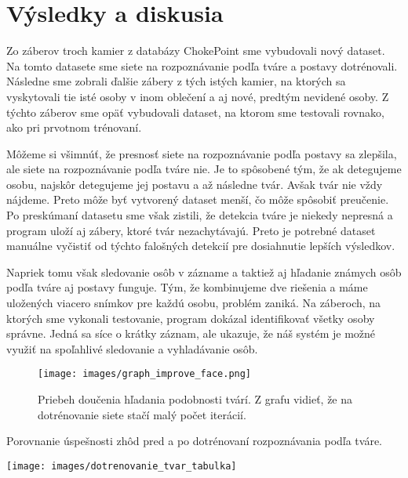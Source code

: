 \section{Výsledky a diskusia}
Zo záberov troch kamier z databázy ChokePoint sme vybudovali nový dataset. 
Na tomto datasete sme siete na rozpoznávanie podľa tváre a postavy dotrénovali.
Následne sme zobrali ďalšie zábery z tých istých kamier, na ktorých sa vyskytovali tie isté osoby v inom oblečení a aj nové, predtým nevidené osoby.
Z týchto záberov sme opäť vybudovali dataset, na ktorom sme testovali rovnako, ako pri prvotnom trénovaní.

Môžeme si všimnúť, že presnosť siete na rozpoznávanie podľa postavy sa zlepšila, ale siete na rozpoznávanie podľa tváre nie.
Je to spôsobené tým, že ak detegujeme osobu, najskôr detegujeme jej postavu a až následne tvár. 
Avšak tvár nie vždy nájdeme. Preto môže byť vytvorený dataset menší, čo môže spôsobiť preučenie.
Po preskúmaní datasetu sme však zistili, že detekcia tváre je niekedy nepresná a program uloží aj zábery, ktoré tvár nezachytávajú.
Preto je potrebné dataset manuálne vyčistiť od týchto falošných detekcií pre dosiahnutie lepších výsledkov.

Napriek tomu však sledovanie osôb v zázname a taktiež aj hľadanie známych osôb podľa tváre aj postavy funguje.
Tým, že kombinujeme dve riešenia a máme uložených viacero snímkov pre každú osobu, problém zaniká. 
Na záberoch, na ktorých sme vykonali testovanie, program dokázal identifikovať všetky osoby správne.
Jedná sa síce o krátky záznam, ale ukazuje, že náš systém je možné využiť na spoľahlivé sledovanie a vyhladávanie osôb.

\begin{figure}[H]
\centerline{\texttt{[image: images/graph\_improve\_face.png]}}
\caption[Priebeh doučenia hľadania podobnosti tvárí]{Priebeh doučenia hľadania podobnosti tvárí. Z grafu vidieť, že na dotrénovanie siete stačí malý počet iterácií.}
\label{obr:graph_learn_face}
\end{figure}


\begin{table}[H]
  \caption[Porovnanie úspešnosti zhôd pred a po dotrénovaní rozpoznávania podľa tváre]{Porovnanie úspešnosti zhôd pred a po dotrénovaní rozpoznávania podľa tváre.}
  \label{tbl:dotrenovanie_tvar_tabulka}
  \begin{center}
  \texttt{[image: images/dotrenovanie\_tvar\_tabulka]}
  \end{center}
\end{table}

